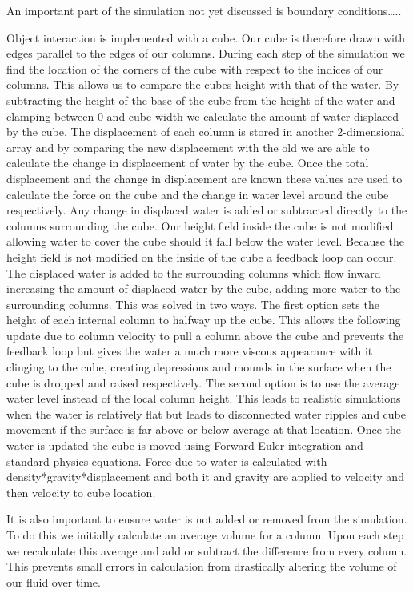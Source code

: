 \documentclass[12pt,titlepage]{article}
\begin{document}
An important part of the simulation not yet discussed is boundary conditions…..

Object interaction is implemented with a cube.  Our cube is therefore drawn with edges parallel to the edges of our columns.  During each step of the simulation we find the location of the corners of the cube with respect to the indices of our columns.  This allows us to compare the cubes height with that of the water.  By subtracting the height of the base of the cube from the height of the water and clamping between 0 and cube width we calculate the amount of water displaced by the cube.  The displacement of each column is stored in another 2-dimensional array and by comparing the new displacement with the old we are able to calculate the change in displacement of water by the cube.  Once the total displacement and the change in displacement are known these values are used to calculate the force on the cube and the change in water level around the cube respectively.  Any change in displaced water is added or subtracted directly to the columns surrounding the cube.  Our height field inside the cube is not modified allowing water to cover the cube should it fall below the water level.  Because the height field is not modified on the inside of the cube a feedback loop can occur.  The displaced water is added to the surrounding columns which flow inward increasing the amount of displaced water by the cube, adding more water to the surrounding columns.  This was solved in two ways.  The first option sets the height of each internal column to halfway up the cube.  This allows the following update due to column velocity to pull a column above the cube and prevents the feedback loop but gives the water a much more viscous appearance with it clinging to the cube, creating depressions and mounds in the surface when the cube is dropped and raised respectively.  The second option is to use the average water level instead of the local column height.  This leads to realistic simulations when the water is relatively flat but leads to disconnected water ripples and cube movement if the surface is far above or below average at that location.  Once the water is updated the cube is moved using Forward Euler integration and standard physics equations.  Force due to water is calculated with density*gravity*displacement and both it and gravity are applied to velocity and then velocity to cube location.

It is also important to ensure water is not added or removed from the simulation.  To do this we initially calculate an average volume for a column.  Upon each step we recalculate this average and add or subtract the difference from every column.  This prevents small errors in calculation from drastically altering the volume of our fluid over time.
\end{document}
